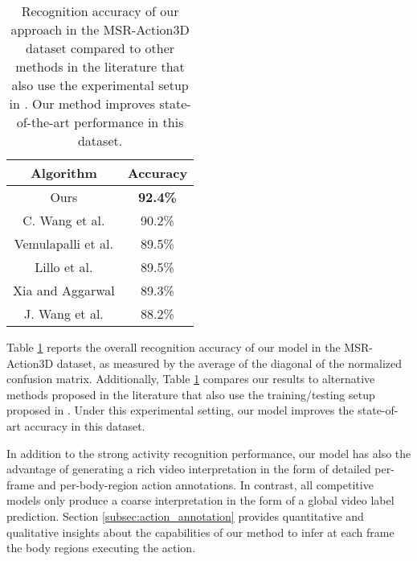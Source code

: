 \begin{table}
\centering
\begin{tabular}{|c|c|}
\hline
\textbf{Algorithm} & \textbf{Accuracy}\\
\hline
Ours  &  \textbf{92.4\%} \\
\hline
C. Wang et al.\cite{Wang2013} &    90.2\% \\
Vemulapalli et al. \cite{vemulapalli2014human} & 89.5\% \\
Lillo et al. \cite{Lillo2014} & 89.5\%\\
Xia and Aggarwal \cite{Xia} & 89.3\% \\
J. Wang et al. \cite{Wang2012} &   88.2\% \\

\hline
\end{tabular}
\caption{Recognition accuracy of our approach in the MSR-Action3D dataset compared to other
methods in the literature that also use the experimental setup in 
\cite{Wang2012}. Our method improves state-of-the-art
performance in this dataset.
}
\label{tab:msr_st}
\end{table}
Table \ref{tab:msr_st} reports the overall recognition accuracy of our model
in the MSR-Action3D dataset,
as measured by the average of the diagonal of the normalized confusion matrix. Additionally,
Table \ref{tab:msr_st} compares our results to alternative methods proposed in the literature
that also use the training/testing setup proposed in \cite{Wang2012}.
Under this experimental setting, our model improves the state-of-art accuracy
in this dataset.

In addition to the strong activity recognition performance, our model
has also the advantage of generating a rich video interpretation in the form of
detailed per-frame and per-body-region action annotations.
In contrast, all competitive models only produce a coarse interpretation
in the form of a global video label prediction. Section \ref{subsec:action_annotation} provides 
quantitative and qualitative insights about the capabilities of our method to infer at each frame 
the body regions executing the action.


